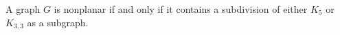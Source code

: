 \documentclass{tufte-handout}
\makeatletter
\renewcommand{\section}{\@startsection{section}%
    {3}{-1.01em}{-3ex \@plus -1ex \@minus -.2ex}%
    {1.5ex \@plus .2ex}
    {\hspace*{-5.5em}\fcolorbox{blue}{blue}{\parbox[c][1.0ex][b]{4em}{\phantom{space}}}
    \normalfont\Large\itshape\color{blue}}}
\makeatother
\begin{document}
\begin{Theorem}
    A graph \(G\) is nonplanar if and only if it contains a subdivision of either \(K_5\) or \(K_{3,3}\) as a subgraph.
    
\end{Theorem}


\makeatletter
  \renewcommand{\section}{\@startsection{section}%
    {3}{0.8em}{-3ex \@plus -1ex \@minus -.2ex}%
    {1.5ex \@plus .2ex}
    {\hspace*{-5.5em}\fcolorbox{Periwinkle}{Periwinkle}{\parbox[c][1.0ex][b]{4em}{\phantom{space}}}
    \normalfont\Large\itshape\color{blue}}}
\makeatother



\end{document}
